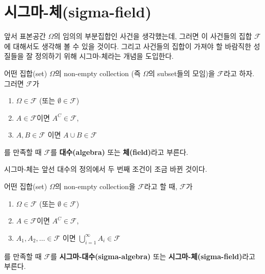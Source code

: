 \documentclass[b5paper,]{scrbook}
\theoremstyle{plain}
\theoremstyle{definition}
\numberwithin{equation}{section}
\let\BeginKnitrBlock\begin \let\EndKnitrBlock\end
\begin{document}
\section{시그마-체(sigma-field)}\label{-sigma-field}

앞서 표본공간 \(\Omega\)의 임의의 부분집합인 사건을 생각했는데, 그러면
이 사건들의 집합 \(\mathcal{F}\)에 대해서도 생각해 볼 수 있을 것이다.
그리고 사건들의 집합이 가져야 할 바람직한 성질들을 잘 정의하기 위해
시그마-체라는 개념을 도입한다.

\BeginKnitrBlock{definition}[대수(체)]
\protect\hypertarget{def:unnamed-chunk-33}{}{\label{def:unnamed-chunk-33}
{} }어떤 집합(set) \(\Omega\)의 non-empty
collection (즉 \(\Omega\)의 subset들의 모임)을 \(\mathcal{F}\)라고 하자.
그러면 \(\mathcal{F}\)가

\begin{enumerate}
\def\labelenumi{\arabic{enumi}.}
\item
  \(\Omega \in \mathcal{F}\) (또는 \(\emptyset \in \mathcal{F}\))
\item
  \(A \in \mathcal{F}\)이면 \(A^{C} \in \mathcal{F}\),
\item
  \(A, B \in \mathcal{F}\) 이면 \(A\cup B \in \mathcal{F}\)
\end{enumerate}

를 만족할 때 \(\mathcal{F}\)를 \textbf{대수(algebra)} 또는
\textbf{체(field)}라고 부른다.
\EndKnitrBlock{definition}

시그마-체는 앞선 대수의 정의에서 두 번째 조건이 조금 바뀐 것이다.

\BeginKnitrBlock{definition}[시그마-체]
\protect\hypertarget{def:unnamed-chunk-34}{}{\label{def:unnamed-chunk-34}
{} }어떤 집합(set) \(\Omega\)의 non-empty
collection을 \(\mathcal{F}\)라고 할 때, \(\mathcal{F}\)가

\begin{enumerate}
\def\labelenumi{\arabic{enumi}.}
\item
  \(\Omega \in \mathcal{F}\) (또는 \(\emptyset \in \mathcal{F}\))
\item
  \(A \in \mathcal{F}\)이면 \(A^{C} \in \mathcal{F}\),
\item
  \(A_{1}, A_{2}, \ldots \in \mathcal{F}\) 이면
  \(\bigcup_{i=1}^{\infty}A_{i} \in \mathcal{F}\)
\end{enumerate}

를 만족할 때 \(\mathcal{F}\)를 \textbf{시그마-대수(sigma-algebra)} 또는
\textbf{시그마-체(sigma-field)}라고 부른다.
\EndKnitrBlock{definition}
\end{document}
